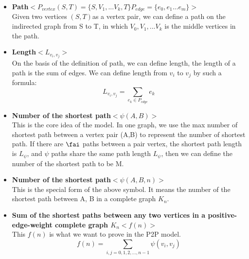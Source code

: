 \documentclass{elegantpaper}
\begin{document}
  \begin{itemize}[noitemsep]\item\textbf{Path\quad $<P_{vertex}(S,T)=\{{S,V_1,...V_k,T}\} P_{edge}=\{{e_0,e_1...e_m}\}>$}\\
 Given two vertices $(S,T)$as a vertex pair, we can define a path on the indirected graph from S to T, in which $V_0,V_1,...V_k$ is the middle vertices in the path.
 \end{itemize}
 
   \begin{itemize}[noitemsep]\item\textbf{Length\quad $<L_{v_i,v_j}>$}\\
 On the basis of the definition of path, we can define length, the length of a path is the sum of edges. We can define length from $v_i$ to $v_j$ by such a formula:\\
 $$L_{v_i,v_j} = \sum_{e_k \in P_{edge}}e_k$$
 \end{itemize}
 
    \begin{itemize}[noitemsep]\item\textbf{Number of the shortest path\quad $<\psi(A,B)>$}\\
 This is the core idea of the model. In one graph, we use the max number of shortest path between a vertex pair (A,B) to represent the number of shortest path. If there are $\fai$ paths between a pair vertex, the shortest path length is $L_\psi$, and $\psi$ paths share the same path length $L_\psi$, then we can define the number of the shortest path to be M.
 \end{itemize}
 
     \begin{itemize}[noitemsep]\item\textbf{Number of the shortest path\quad $<\psi(A,B,n)>$}\\
 This is the special form of the above symbol. It means the number of the shortest path between A, B in a complete graph $K_n$.
 \end{itemize}
 
 \begin{itemize}[noitemsep]\item\textbf{Sum of the shortest paths between any two vertices in a positive-edge-weight complete graph $K_n$\quad $<f(n)>$}\\
This $f(n)$ is what we want to prove in the P2P model.
$$f(n) = \sum_{i,j = 0,1,2,...,n-1}\psi(v_i,v_j)$$
 \end{itemize}
 
\end{document}
